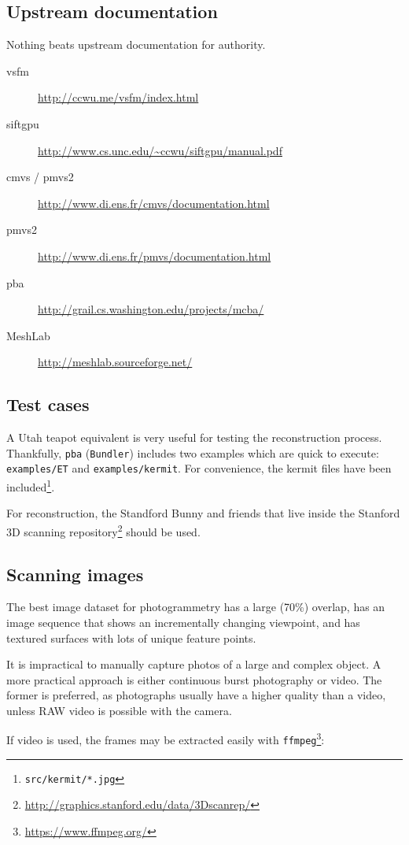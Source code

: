 \documentclass{article}
\begin{document}
\subsection{Upstream documentation}
Nothing beats upstream documentation for authority.
\begin{description}
    \item[vsfm] \url{http://ccwu.me/vsfm/index.html}
    \item[siftgpu] \url{http://www.cs.unc.edu/~ccwu/siftgpu/manual.pdf}
    \item[cmvs / pmvs2] \url{http://www.di.ens.fr/cmvs/documentation.html}
    \item[pmvs2] \url{http://www.di.ens.fr/pmvs/documentation.html}
    \item[pba] \url{http://grail.cs.washington.edu/projects/mcba/}
    \item[MeshLab] \url{http://meshlab.sourceforge.net/}
\end{description}
\subsection{Test cases}
A Utah teapot equivalent is very useful for testing the reconstruction process. Thankfully, {\tt pba} ({\tt Bundler}) includes two examples which are quick to execute: {\tt examples/ET} and {\tt examples/kermit}. For convenience, the kermit files have been included\footnote{{\tt src/kermit/*.jpg}}.

For reconstruction, the Standford Bunny and friends that live inside the Stanford 3D scanning repository\footnote{\url{http://graphics.stanford.edu/data/3Dscanrep/}} should be used.
\subsection{Scanning images}
The best image dataset for photogrammetry has a large (70\%) overlap, has an image sequence that shows an incrementally changing viewpoint, and has textured surfaces with lots of unique feature points.

It is impractical to manually capture photos of a large and complex object. A more practical approach is either continuous burst photography or video. The former is preferred, as photographs usually have a higher quality than a video, unless RAW video is possible with the camera.

If video is used, the frames may be extracted easily with {\tt ffmpeg}\footnote{\url{https://www.ffmpeg.org/}}:
\end{document}
